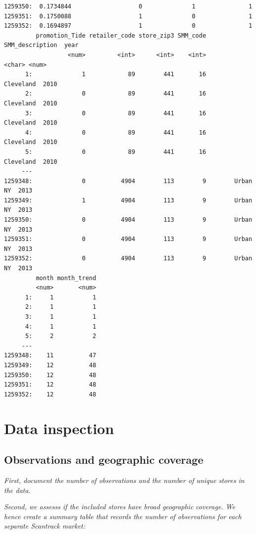 \documentclass[
]{article}
\begin{document}
\begin{verbatim}
1259350:  0.1734844                   0              1               1
1259351:  0.1750088                   1              0               1
1259352:  0.1694897                   1              0               1
         promotion_Tide retailer_code store_zip3 SMM_code SMM_description  year
                  <num>         <int>      <int>    <int>          <char> <num>
      1:              1            89        441       16       Cleveland  2010
      2:              0            89        441       16       Cleveland  2010
      3:              0            89        441       16       Cleveland  2010
      4:              0            89        441       16       Cleveland  2010
      5:              0            89        441       16       Cleveland  2010
     ---                                                                       
1259348:              0          4904        113        9        Urban NY  2013
1259349:              1          4904        113        9        Urban NY  2013
1259350:              0          4904        113        9        Urban NY  2013
1259351:              0          4904        113        9        Urban NY  2013
1259352:              0          4904        113        9        Urban NY  2013
         month month_trend
         <num>       <num>
      1:     1           1
      2:     1           1
      3:     1           1
      4:     1           1
      5:     2           2
     ---                  
1259348:    11          47
1259349:    12          48
1259350:    12          48
1259351:    12          48
1259352:    12          48
\end{verbatim}

\newpage

\section{Data inspection}\label{data-inspection}

\subsection{Observations and geographic
coverage}\label{observations-and-geographic-coverage}

\emph{First, document the number of observations and the number of
unique stores in the data.}

\emph{Second, we assesss if the included stores have broad geographic
coverage. We hence create a summary table that records the number of
observations for each separate Scantrack market:}
\end{document}
